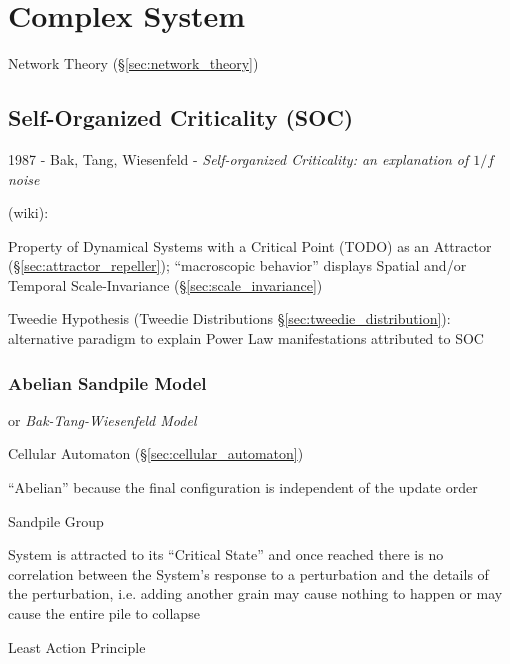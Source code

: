 \section{Complex System}\label{sec:complex_system}

Network Theory (\S\ref{sec:network_theory})



\subsection{Self-Organized Criticality (SOC)}\label{sec:soc}

1987 - Bak, Tang, Wiesenfeld - \emph{Self-organized Criticality: an explanation
  of $1/f$ noise}

(wiki):

Property of Dynamical Systems with a Critical Point (TODO) as an Attractor
(\S\ref{sec:attractor_repeller}); ``macroscopic behavior'' displays Spatial
and/or Temporal Scale-Invariance (\S\ref{sec:scale_invariance})

\fist Tweedie Hypothesis (Tweedie Distributions
\S\ref{sec:tweedie_distribution}): alternative paradigm to explain Power Law
manifestations attributed to SOC



\subsubsection{Abelian Sandpile Model}\label{sec:abelian_sandpile}

or \emph{Bak-Tang-Wiesenfeld Model}

Cellular Automaton (\S\ref{sec:cellular_automaton})

``Abelian'' because the final configuration is independent of the update order

Sandpile Group

System is attracted to its ``Critical State'' and once reached there is no
correlation between the System's response to a perturbation and the details of
the perturbation, i.e. adding another grain may cause nothing to happen or may
cause the entire pile to collapse

Least Action Principle




